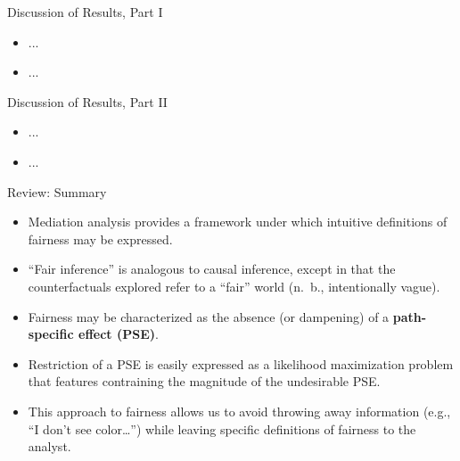 \documentclass[12pt,t,handout]{beamer}
\begin{document}

\begin{frame}[c]{Discussion of Results, Part I}

\begin{center}
\begin{itemize}
  \item ...
  \item ...
\end{itemize}
\end{center}


\end{frame}


\begin{frame}[c]{Discussion of Results, Part II}

\begin{center}
\begin{itemize}
  \item ...
  \item ...
\end{itemize}
\end{center}


\end{frame}


\begin{frame}[c]{Review: Summary}

\begin{center}
\begin{itemize}
  \itemsep8pt
  \item Mediation analysis provides a framework under which intuitive
    definitions of fairness may be expressed.
  \item ``Fair inference'' is analogous to causal inference, except in that the
    counterfactuals explored refer to a ``fair'' world (n.~b., intentionally
    vague).
  \item Fairness may be characterized as the absence (or dampening) of a
    \textbf{path-specific effect (PSE)}.
  \item Restriction of a PSE is easily expressed as a likelihood maximization
    problem that features contraining the magnitude of the undesirable PSE.
  \item This approach to fairness allows us to avoid throwing away information
    (e.g., ``I don't see color\dots'') while leaving specific definitions of
    fairness to the analyst.
\end{itemize}
\end{center}


\end{frame}
\end{document}
